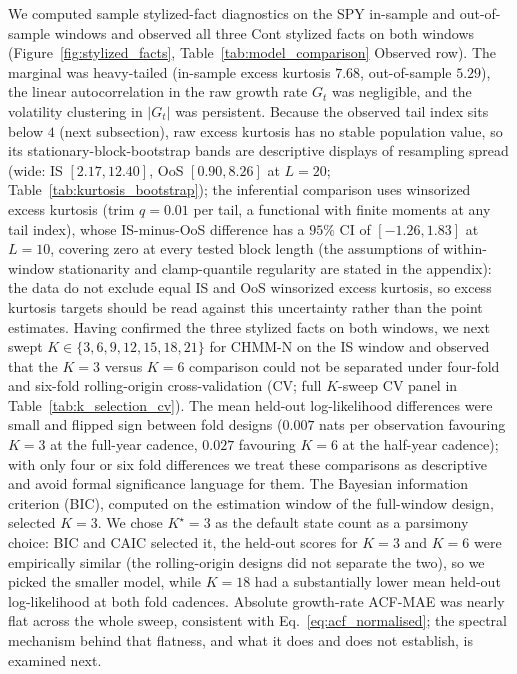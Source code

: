 We computed sample stylized-fact diagnostics on the SPY in-sample and out-of-sample windows and observed all three Cont stylized facts on both windows (Figure~\ref{fig:stylized_facts}, Table~\ref{tab:model_comparison} Observed row). The marginal was heavy-tailed (in-sample excess kurtosis $7.68$, out-of-sample $5.29$), the linear autocorrelation in the raw growth rate $G_t$ was negligible, and the volatility clustering in $|G_t|$ was persistent. Because the observed tail index sits below $4$ (next subsection), raw excess kurtosis has no stable population value, so its stationary-block-bootstrap bands are descriptive displays of resampling spread (wide: IS $[2.17, 12.40]$, OoS $[0.90, 8.26]$ at $L = 20$; Table~\ref{tab:kurtosis_bootstrap}); the inferential comparison uses winsorized excess kurtosis (trim $q = 0.01$ per tail, a functional with finite moments at any tail index), whose IS-minus-OoS difference has a $95\%$ CI of $[-1.26, 1.83]$ at $L = 10$, covering zero at every tested block length (the assumptions of within-window stationarity and clamp-quantile regularity are stated in the appendix): the data do not exclude equal IS and OoS winsorized excess kurtosis, so excess kurtosis targets should be read against this uncertainty rather than the point estimates. Having confirmed the three stylized facts on both windows, we next swept $K \in \{3, 6, 9, 12, 15, 18, 21\}$ for CHMM-N on the IS window and observed that the $K = 3$ versus $K = 6$ comparison could not be separated under four-fold and six-fold rolling-origin cross-validation (CV; full $K$-sweep CV panel in Table~\ref{tab:k_selection_cv}). The mean held-out log-likelihood differences were small and flipped sign between fold designs ($0.007$ nats per observation favouring $K = 3$ at the full-year cadence, $0.027$ favouring $K = 6$ at the half-year cadence); with only four or six fold differences we treat these comparisons as descriptive and avoid formal significance language for them. The Bayesian information criterion (BIC), computed on the estimation window of the full-window design, selected $K = 3$. We chose $K^\star = 3$ as the default state count as a parsimony choice: BIC and CAIC selected it, the held-out scores for $K = 3$ and $K = 6$ were empirically similar (the rolling-origin designs did not separate the two), so we picked the smaller model, while $K = 18$ had a substantially lower mean held-out log-likelihood at both fold cadences. Absolute growth-rate ACF-MAE was nearly flat across the whole sweep, consistent with Eq.~\eqref{eq:acf_normalised}; the spectral mechanism behind that flatness, and what it does and does not establish, is examined next.

